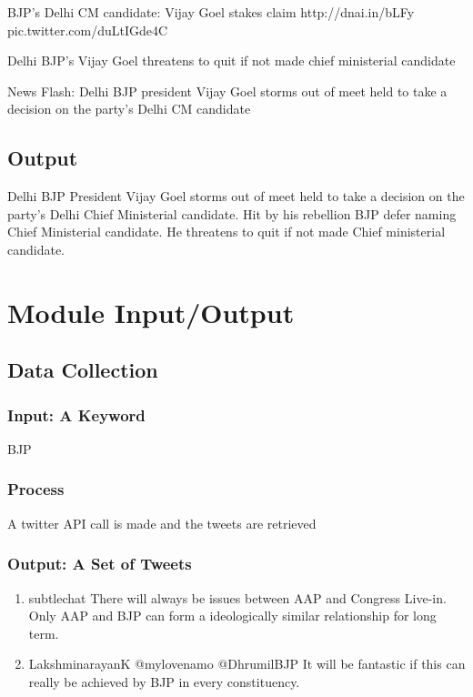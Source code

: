 \documentclass[conference]{IEEEtran}
\begin{document}
BJP's Delhi CM candidate: Vijay Goel stakes claim  http://dnai.in/bLFy  pic.twitter.com/duLtIGde4C

Delhi BJP's Vijay Goel threatens to quit if not made chief ministerial candidate

News Flash: Delhi BJP president Vijay Goel storms out of meet held to take a  decision on the party's Delhi CM candidate

\subsection{\textbf{Output}}
Delhi BJP President Vijay Goel storms out of meet held to take a decision on the party’s Delhi Chief Ministerial candidate. Hit by his rebellion BJP defer naming Chief Ministerial candidate. He threatens to quit if not made Chief ministerial candidate.

\section{\textbf{Module Input/Output}}
\subsection{\textbf{Data Collection}}

\subsubsection{\textbf{Input:} A Keyword}
BJP

\subsubsection{\textbf{Process}}
\par A twitter API call is made and the tweets are retrieved

\subsubsection{\textbf{Output:} A Set of Tweets}
\begin{enumerate}
\item{subtlechat There will always be issues between AAP and Congress Live-in. Only AAP and BJP can form a ideologically similar relationship for long term. }

\item{LakshminarayanK @mylovenamo @DhrumilBJP It will be fantastic if this can really be achieved by BJP in every constituency.}

\end{enumerate}
\end{document}
